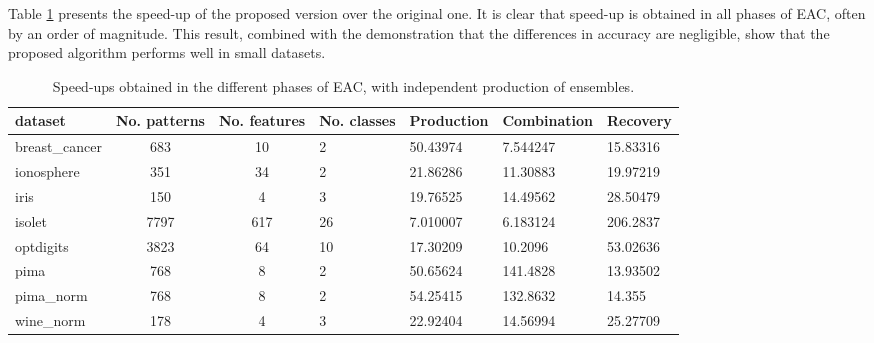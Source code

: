 
Table \ref{tab:validation speedup all} presents the speed-up of the proposed version over the original one.
It is clear that speed-up is obtained in all phases of EAC, often by an order of magnitude.
This result, combined with the demonstration that the differences in accuracy are negligible, show that the proposed algorithm performs well in small datasets.

\begin{table}[h]
\centering
\caption{Speed-ups obtained in the different phases of EAC, with independent production of ensembles.}

\begin{tabular}{lccllll}
\toprule
dataset &  No. patterns &  No. features & No. classes & Production & Combination & Recovery \\
\midrule
breast\_cancer &           683 &            10 &           2 &      50.43974 &   7.544247 &        15.83316 \\
ionosphere    &           351 &            34 &           2 &      21.86286 &   11.30883 &        19.97219 \\
iris          &           150 &             4 &           3 &      19.76525 &   14.49562 &        28.50479 \\
isolet        &          7797 &           617 &          26 &      7.010007 &   6.183124 &        206.2837 \\
optdigits     &          3823 &            64 &          10 &      17.30209 &    10.2096 &        53.02636 \\
pima          &           768 &             8 &           2 &      50.65624 &   141.4828 &        13.93502 \\
pima\_norm     &           768 &             8 &           2 &      54.25415 &   132.8632 &          14.355 \\
wine\_norm     &           178 &             4 &           3 &      22.92404 &   14.56994 &        25.27709 \\
\bottomrule
\end{tabular}

\label{tab:validation speedup all}
\end{table}


